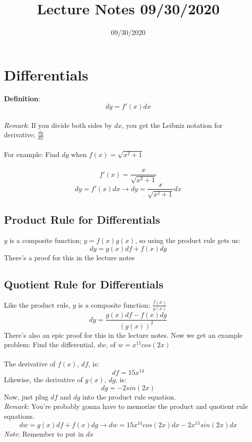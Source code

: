 \documentclass{article}
\title{Lecture Notes 09/30/2020}
\date{09/30/2020}
\begin{document}
\maketitle
\section{Differentials}
\textbf{Definition}: \[dy = f'(x)dx\]\\
\textit{Remark}: If you divide both sides by $dx$, you get the Leibniz notation for derivative; $\frac{dy}{dx}$\\\\
For example: Find $dy$ when $f(x) = \sqrt{x^2+1}$\\\\
\[f'(x) = \frac{x}{\sqrt{x^2+1}}\]
\[dy = f'(x)dx \to dy = \frac{x}{\sqrt{x^2+1}}dx\]
\subsection{Product Rule for Differentials}
$y$ is a composite function; $y = f(x)g(x)$, so using the product rule gets us:
\[dy = g(x)df + f(x)dg\]
There's a proof for this in the lecture notes
\subsection{Quotient Rule for Differentials}
Like the product rule, $y$ is a composite function; $\frac{f(x)}{g(x)}$
\[dy = \frac{g(x)df - f(x)dg}{(g(x))^2}\]
There's also an epic proof for this in the lecture notes.\newpage
Now we get an example problem: Find the differential, $dw$, of $w = x^{15}cos(2x)$\\\\
The derivative of $f(x)$, $df$, is:
\[df = 15x^{14}\]
Likewise, the derivative of $g(x)$, $dg$, is:
\[dg = -2sin(2x)\]
Now, just plug $df$ and $dg$ into the product rule equation.\\
\textit{Remark}: You're probably gonna have to memorize the product and quotient rule equations.
\[dw = g(x)df + f(x)dg \to dw = 15x^{14}cos(2x)dx - 2x^{15}sin(2x)dx\]
\textit{Note}: Remember to put in $dx$
\end{document}
